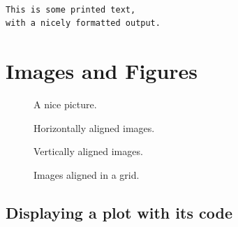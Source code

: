 \documentclass[10pt,parskip=half,
	toc=sectionentrywithdots,
	bibliography=totocnumbered,
	captions=tableheading,numbers=noendperiod]{scrartcl}
\begin{document}
\begin{lstlisting}[backgroundcolor=\color{blue!10},language={},postbreak={},numbers=none,xrightmargin=7pt,belowskip=5pt,aboveskip=5pt,breakindent=0pt,]

This is some printed text,
with a nicely formatted output.

\end{lstlisting}

\section{Images and Figures}\label{images-and-figures}

    \begin{figure}[!bh]
        \begin{center}\end{center}\caption{A nice picture.}\label{fig:example}
    \end{figure}

    \begin{figure}
        \begin{center}\end{center}\caption{Horizontally aligned images.}\label{fig:example_h}
    \end{figure}

    \begin{figure}
        \begin{center}\end{center}\caption{Vertically aligned images.}\label{fig:example_v}
    \end{figure}

    \begin{figure}
        \begin{center}\end{center}\caption{Images aligned in a grid.}\label{fig:example_grid}
    \end{figure}

\subsection{Displaying a plot with its
code}\label{displaying-a-plot-with-its-code}
\end{document}
